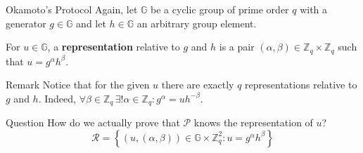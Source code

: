 \documentclass[xcolor={usenames,dvipsnames}]{beamer}
\begin{document}
    \begin{frame}{Okamoto's Protocol}
        Again, let $\mathbb{G}$ be a cyclic group of prime order $q$ with a generator $g \in \mathbb{G}$ and let $h \in \mathbb{G}$ an arbitrary group element.\pause

        \begin{definition}
            For $u \in \mathbb{G}$, a \textbf{representation} relative to $g$ and $h$ is a pair $(\alpha,\beta) \in \mathbb{Z}_q \times \mathbb{Z}_q$ such that $u=g^{\alpha}h^{\beta}$.\pause
        \end{definition}

        \begin{block}{Remark}
            Notice that for the given $u$ there are exactly $q$ representations relative to $g$ and $h$. Indeed, $\forall \beta \in \mathbb{Z}_q \, \exists! \alpha \in \mathbb{Z}_q: g^{\alpha} = uh^{-\beta}$. \pause
        \end{block}

        \begin{alertblock}{Question}
            How do we actually prove that $\mathcal{P}$ knows the representation of $u$?
            \begin{equation*}
                \mathcal{R} = \left\{ (u,(\alpha,\beta)) \in \mathbb{G} \times \mathbb{Z}_q^2: u = g^{\alpha}h^{\beta} \right\}
            \end{equation*}
        \end{alertblock}
    \end{frame}
\end{document}
